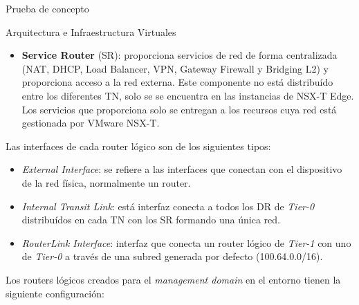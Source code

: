 \begin{section}{Prueba de concepto}
\begin{subsection}{Arquitectura e Infraestructura Virtuales\cite{CFVirtInfraes}}
\begin{itemize}
  \item \textbf{Service Router} (SR): proporciona servicios de red de forma centralizada (NAT, DHCP, Load Balancer, VPN, Gateway Firewall y Bridging L2) y proporciona acceso a la red externa. Este componente no está distribuído entre los diferentes TN, solo se se encuentra en las instancias de NSX-T Edge. Los servicios que proporciona solo se entregan a los recursos cuya red está gestionada por VMware NSX-T.
\end{itemize}

Las interfaces de cada router lógico son de los siguientes tipos:

\begin{itemize}
  \item \textit{External Interface}: se refiere a las interfaces que conectan con el dispositivo de la red física, normalmente un router.
  \item \textit{Internal Transit Link}: está interfaz conecta a todos los DR de \textit{Tier-0} distribuídos en cada TN con los SR formando una única red.
  \item \textit{RouterLink Interface}: interfaz que conecta un router lógico de \textit{Tier-1} con uno de \textit{Tier-0} a través de una subred generada por defecto (100.64.0.0/16).
\end{itemize}

Los routers lógicos creados para el \textit{management domain} en el entorno tienen la siguiente configuración:


\end{subsection}
\end{section}

